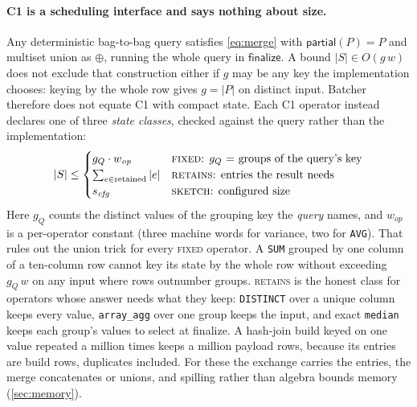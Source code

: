 \documentclass[10pt,twocolumn,letterpaper]{article}   %
\newcommand{\sys}{Batcher}
\newcommand{\Ca}{\textsc{C1}}
\begin{document}
\paragraph{\Ca{} is a scheduling interface and says nothing about size.} Any deterministic
bag-to-bag query satisfies \cref{eq:merge} with $\mathsf{partial}(P)=P$ and multiset union as
$\oplus$, running the whole query in $\mathsf{finalize}$. A bound $|S|\in O(g\,w)$ does not
exclude that construction either if $g$ may be any key the implementation chooses: keying by
the whole row gives $g=|P|$ on distinct input. \sys{} therefore does not equate \Ca{} with
compact state. Each \Ca{} operator instead declares one of three \emph{state classes},
checked against the query rather than the implementation:
\begin{equation}
|S| \le
\begin{cases}
g_Q \cdot w_{\mathit{op}} & \text{\textsc{fixed}: $g_Q$ = groups of the query's key}\\
\sum_{e \in \text{retained}} |e| & \text{\textsc{retains}: entries the result needs}\\
s_{\mathit{cfg}} & \text{\textsc{sketch}: configured size}
\end{cases}
\label{eq:bound}
\end{equation}
Here $g_Q$ counts the distinct values of the grouping key the \emph{query} names, and
$w_{\mathit{op}}$ is a per-operator constant (three machine words for variance, two for
\texttt{AVG}). That rules out the union trick for every \textsc{fixed} operator. A
\texttt{SUM} grouped by one column of a ten-column row cannot key its state by the whole row
without exceeding $g_Q\,w$ on any input where rows outnumber groups. \textsc{retains} is the
honest class for operators whose answer needs what they keep: \texttt{DISTINCT} over a unique
column keeps every value, \texttt{array\_agg} over one group keeps the input, and exact
\texttt{median} keeps each group's values to select at finalize. A hash-join build keyed on
one value repeated a million times keeps a million payload rows, because its entries are build
rows, duplicates included. For these the exchange carries the entries, the merge concatenates
or unions, and spilling rather than algebra bounds memory (\cref{sec:memory}).
\end{document}
